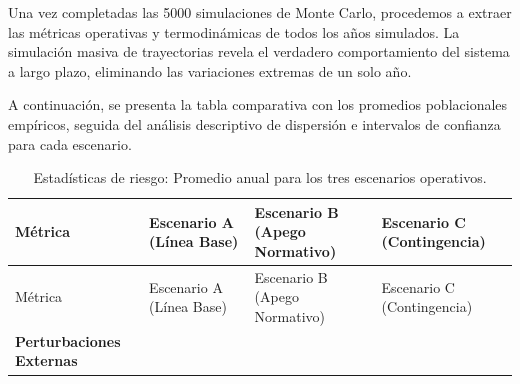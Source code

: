 \documentclass[
  spanish,
  us-letterpaper,
]{scrreprt}
\numberwithin{equation}{section}
\theoremstyle{plain}
\theoremstyle{plain}
\theoremstyle{definition}
\theoremstyle{plain}
\theoremstyle{remark}
\begin{document}
Una vez completadas las 5000 simulaciones de Monte Carlo, procedemos a
extraer las métricas operativas y termodinámicas de todos los años
simulados. La simulación masiva de trayectorias revela el verdadero
comportamiento del sistema a largo plazo, eliminando las variaciones
extremas de un solo año.

A continuación, se presenta la tabla comparativa con los promedios
poblacionales empíricos, seguida del análisis descriptivo de dispersión
e intervalos de confianza para cada escenario.

\begin{longtable}[]{@{}
  >{\raggedright\arraybackslash}p{}
  >{\centering\arraybackslash}p{}
  >{\centering\arraybackslash}p{}
  >{\centering\arraybackslash}p{}@{}}
\caption{Estadísticas de riesgo: Promedio anual para los tres escenarios
operativos.}\label{tbl-riesgo-operativo}\tabularnewline
\toprule\noalign{}
\begin{minipage}[b]{\linewidth}\raggedright
Métrica
\end{minipage} & \begin{minipage}[b]{\linewidth}\centering
Escenario A (Línea Base)
\end{minipage} & \begin{minipage}[b]{\linewidth}\centering
Escenario B (Apego Normativo)
\end{minipage} & \begin{minipage}[b]{\linewidth}\centering
Escenario C (Contingencia)
\end{minipage} \\
\midrule\noalign{}
\endfirsthead
\toprule\noalign{}
\begin{minipage}[b]{\linewidth}\raggedright
Métrica
\end{minipage} & \begin{minipage}[b]{\linewidth}\centering
Escenario A (Línea Base)
\end{minipage} & \begin{minipage}[b]{\linewidth}\centering
Escenario B (Apego Normativo)
\end{minipage} & \begin{minipage}[b]{\linewidth}\centering
Escenario C (Contingencia)
\end{minipage} \\
\midrule\noalign{}
\endhead
\bottomrule\noalign{}
\endlastfoot
\textbf{Perturbaciones Externas} & & & \\

\end{longtable}
\end{document}
